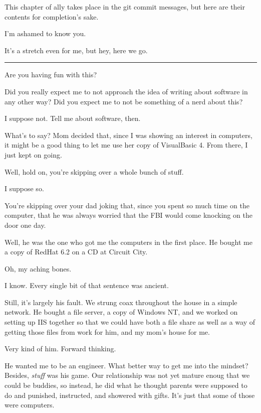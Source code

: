 This chapter of ally takes place in the git commit messages, but here are their contents for completion's sake.

\begin{ally}
I'm ashamed to know you.
\end{ally}
It's a stretch even for me, but hey, here we go.

\begin{center}\rule{0.5\linewidth}{\linethickness}\end{center}

\begin{ally}
Are you having fun with this?
\end{ally}
Did you really expect me to not approach the idea of writing about software in any other way? Did you expect me to not be something of a nerd about this?

\begin{ally}
I suppose not. Tell me about software, then.
\end{ally}
What's to say? Mom decided that, since I was showing an interest in computers, it might be a good thing to let me use her copy of VisualBasic 4. From there, I just kept on going.

\begin{ally}
Well, hold on, you're skipping over a whole bunch of stuff.
\end{ally}
I suppose so.

\begin{ally}
You're skipping over your dad joking that, since you spent so much time on the computer, that he was always worried that the FBI would come knocking on the door one day.
\end{ally}
Well, he was the one who got me the computers in the first place. He bought me a copy of RedHat 6.2 on a CD at Circuit City.

\begin{ally}
Oh, my aching bones.
\end{ally}
I know. Every single bit of that sentence was ancient.

Still, it's largely his fault. We strung coax throughout the house in a simple network. He bought a file server, a copy of Windows NT, and we worked on setting up IIS together so that we could have both a file share as well as a way of getting those files from work for him, and my mom's house for me.

\begin{ally}
Very kind of him. Forward thinking.
\end{ally}
He wanted me to be an engineer. What better way to get me into the mindset? Besides, \emph{stuff} was his game. Our relationship was not yet mature enoug that we could be buddies, so instead, he did what he thought parents were supposed to do and punished, instructed, and showered with gifts. It's just that some of those were computers.

